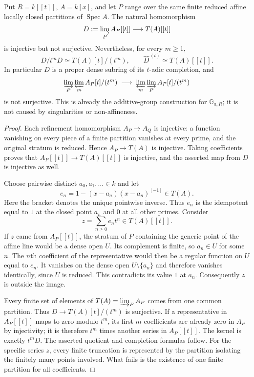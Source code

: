 \begin{proposition}\label{B:uniform-partition-obstruction}
Put $R=k[[t]]$, $A=k[x]$, and let $P$ range over the same finite reduced
affine locally closed partitions of $\operatorname{Spec}A$.  The
natural homomorphism
\[
 D:=\varinjlim_P A_P[[t]]\longrightarrow T(A)[[t]]
\]
is injective but not surjective.  Nevertheless, for every $m\geq1$,
\[
 D/t^mD\simeq T(A)[t]/(t^m),\qquad
 \widehat D^{\,(t)}\simeq T(A)[[t]].
\]
In particular $D$ is a proper dense subring of its $t$-adic completion,
and
\[
 \varinjlim_P\varprojlim_m A_P[t]/(t^m)
 \;\longrightarrow\;
 \varprojlim_m\varinjlim_P A_P[t]/(t^m)
\]
is not surjective.  This is already the additive-group construction for
$\mathbb G_{a,R}$; it is not caused by singularities or non-affineness.
\end{proposition}

\begin{proof}
Each refinement homomorphism $A_P\to A_Q$ is injective: a function
vanishing on every piece of a finite partition vanishes at every prime,
and the original stratum is reduced.  Hence $A_P\to T(A)$ is
injective.  Taking coefficients proves that
$A_P[[t]]\to T(A)[[t]]$ is injective, and the asserted map from $D$
is injective as well.

Choose pairwise distinct $a_0,a_1,\ldots\in k$ and let
\[
 e_n=1-(x-a_n)(x-a_n)^{[-1]}\in T(A).
\]
Here the bracket denotes the unique pointwise inverse.  Thus $e_n$ is
the idempotent equal to $1$ at the closed point $a_n$ and $0$ at all
other primes.  Consider
\[
 z=\sum_{n\geq0}e_nt^n\in T(A)[[t]].
\]
If $z$ came from $A_P[[t]]$, the stratum of $P$ containing the generic
point of the affine line would be a dense open $U$.  Its complement
is finite, so $a_n\in U$ for some $n$.  The $n$th coefficient of the
representative would then be a regular function on $U$ equal to $e_n$.
It vanishes on the dense open $U\setminus\{a_n\}$ and therefore
vanishes identically, since $U$ is reduced.  This contradicts its value
$1$ at $a_n$.  Consequently $z$ is outside the image.

Every finite set of elements of $T(A)=\varinjlim_PA_P$ comes from
one common partition.  Thus $D\to T(A)[t]/(t^m)$ is surjective.
If a representative in $A_P[[t]]$ maps to zero modulo $t^m$, its first
$m$ coefficients are already zero in $A_P$ by injectivity; it is
therefore $t^m$ times another series in $A_P[[t]]$.  The kernel is
exactly $t^mD$.  The asserted quotient and completion formulas follow.
For the specific series $z$, every finite truncation is represented
by the partition isolating the finitely many points involved.  What
fails is the existence of one finite partition for all coefficients.
\end{proof}

